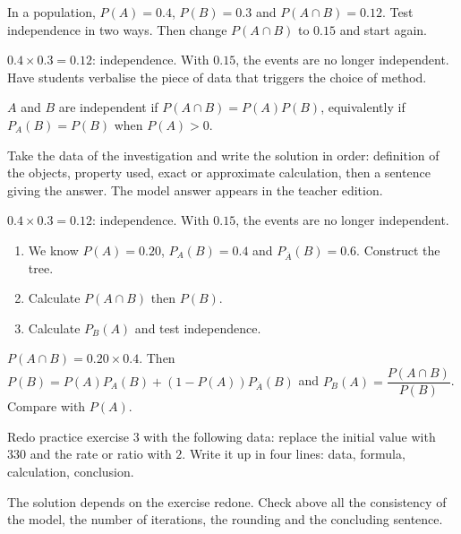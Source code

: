 \begin{activity}
In a population, $P(A)=\num{0,4}$, $P(B)=\num{0,3}$ and $P(A\cap B)=\num{0,12}$. Test independence in two ways. Then change $P(A\cap B)$ to $\num{0,15}$ and start again.

\end{activity}
\begin{solution}$\num{0,4}\times\num{0,3}=\num{0,12}$: independence. With $\num{0,15}$, the events are no longer independent. Have students verbalise the piece of data that triggers the choice of method.\end{solution}

\begin{summary}$A$ and $B$ are independent if $P(A\cap B)=P(A)P(B)$, equivalently if $P_A(B)=P(B)$ when $P(A)>0$.\end{summary}

\begin{example}
Take the data of the investigation and write the solution in order: definition of the objects, property used, exact or approximate calculation, then a sentence giving the answer. The model answer appears in the teacher edition.
\end{example}
\begin{solution}$\num{0,4}\times\num{0,3}=\num{0,12}$: independence. With $\num{0,15}$, the events are no longer independent.\end{solution}

\begin{exercise}[essential]
\begin{enumerate}\item We know $P(A)=\num{0,20}$, $P_A(B)=\num{0,4}$ and $P_{\overline A}(B)=\num{0,6}$. Construct the tree.\item Calculate $P(A\cap B)$ then $P(B)$.\item Calculate $P_B(A)$ and test independence.\end{enumerate}
\end{exercise}
\begin{solution}$P(A\cap B)=\num{0,20}\times\num{0,4}$. Then $P(B)=P(A)P_A(B)+(1-P(A))P_{\overline A}(B)$ and $P_B(A)=\dfrac{P(A\cap B)}{P(B)}$. Compare with $P(A)$.\end{solution}


\begin{homework}Redo practice exercise 3 with the following data: replace the initial value with $330$ and the rate or ratio with $2$. Write it up in four lines: data, formula, calculation, conclusion.\end{homework}
\begin{solution}The solution depends on the exercise redone. Check above all the consistency of the model, the number of iterations, the rounding and the concluding sentence.\end{solution}

